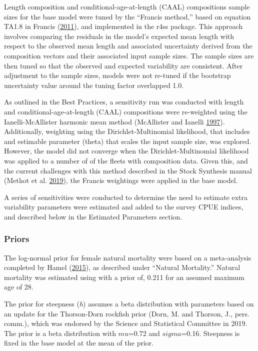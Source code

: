 \documentclass[12pt,]{article}
\begin{document}
Length composition and conditional-age-at-length (CAAL) compositions
sample sizes for the base model were tuned by the ``Francis method,''
based on equation TA1.8 in Francis
(\protect\hyperlink{ref-Francis2011}{2011}), and implemented in the r4ss
package. This approach involves comparing the residuals in the model's
expected mean length with respect to the observed mean length and
associated uncertainty derived from the composition vectors and their
associated input sample sizes. The sample sizes are then tuned so that
the observed and expected variability are consistent. After adjustment
to the sample sizes, models were not re-tuned if the bootstrap
uncertainty value around the tuning factor overlapped 1.0.

As outlined in the Best Practices, a sensitivity run was conducted with
length and conditional-age-at-length (CAAL) compositions were
re-weighted using the Ianelli-McAllister harmonic mean method
(McAllister and Ianelli \protect\hyperlink{ref-McAllister1997}{1997}).
Additionally, weighting using the Dirichlet-Multinomial likelihood, that
includes and estimable parameter (theta) that scales the input sample
size, was explored. However, the model did not converge when the
Dirichlet-Multinomial likelihood was applied to a number of of the
fleets with composition data. Given this, and the current challenges
with this method described in the Stock Synthesis manual (Methot et al.
\protect\hyperlink{ref-Methot2019}{2019}), the Francis weightings were
applied in the base model.

A series of sensitivities were conducted to determine the need to
estimate extra variability parameters were estimated and added to the
survey CPUE indices, and described below in the Estimated Parameters
section.

\subsubsection{Priors}\label{priors}

The log-normal prior for female natural mortality were based on a
meta-analysis completed by Hamel
(\protect\hyperlink{ref-Hamel2015}{2015}), as described under ``Natural
Mortality.'' Natural mortality was estimated using with a prior of,
0.211 for an assumed maximum age of 28.

The prior for steepness (\emph{h}) assumes a beta distribution with
parameters based on an update for the Thorson-Dorn rockfish prior (Dorn,
M. and Thorson, J., pers. comm.), which was endorsed by the Science and
Statistical Committee in 2019. The prior is a beta distribution with
\(mu\)=0.72 and \(sigma\)=0.16. Steepness is fixed in the base model at
the mean of the prior.
\end{document}
